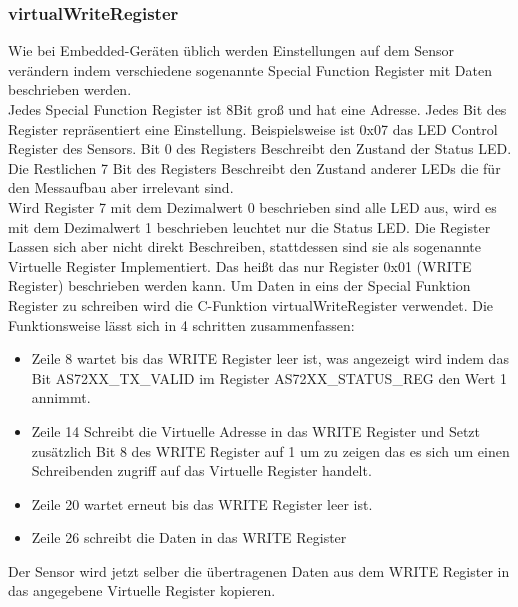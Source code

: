 \subsubsection{virtualWriteRegister}
Wie bei Embedded-Geräten üblich werden Einstellungen auf dem Sensor verändern indem verschiedene sogenannte Special Function Register mit Daten beschrieben werden.\\
Jedes Special Function Register ist 8Bit groß und hat eine Adresse. Jedes Bit des Register repräsentiert eine Einstellung.
Beispielsweise ist 0x07 das LED Control Register des Sensors.
Bit 0 des Registers Beschreibt den Zustand der Status LED.
Die Restlichen 7 Bit des Registers Beschreibt den Zustand anderer LEDs die für den Messaufbau aber irrelevant sind.\\
Wird Register 7 mit dem Dezimalwert 0 beschrieben sind alle LED aus, wird es mit dem Dezimalwert 1 beschrieben leuchtet nur die Status LED.
Die Register Lassen sich aber nicht direkt Beschreiben, stattdessen sind sie als sogenannte Virtuelle Register Implementiert.
Das heißt das nur Register 0x01 (WRITE Register) beschrieben werden kann.
Um Daten in eins der Special Funktion Register zu schreiben wird die C-Funktion virtualWriteRegister verwendet.
Die Funktionsweise lässt sich in 4 schritten zusammenfassen:
\begin{itemize}
	\item Zeile 8 wartet bis das WRITE Register leer ist, was angezeigt wird indem  das Bit AS72XX\_TX\_VALID im  Register AS72XX\_STATUS\_REG den Wert 1 annimmt.
	\item Zeile 14 Schreibt die Virtuelle Adresse in das WRITE Register und Setzt zusätzlich Bit 8 des WRITE Register auf 1 um zu zeigen das es sich um einen Schreibenden zugriff auf das Virtuelle Register handelt.
	\item Zeile 20 wartet erneut bis das WRITE Register leer ist.
	\item Zeile 26 schreibt die Daten in das WRITE Register
\end{itemize}
Der Sensor wird jetzt selber die übertragenen Daten aus dem WRITE Register in das angegebene Virtuelle Register kopieren.


